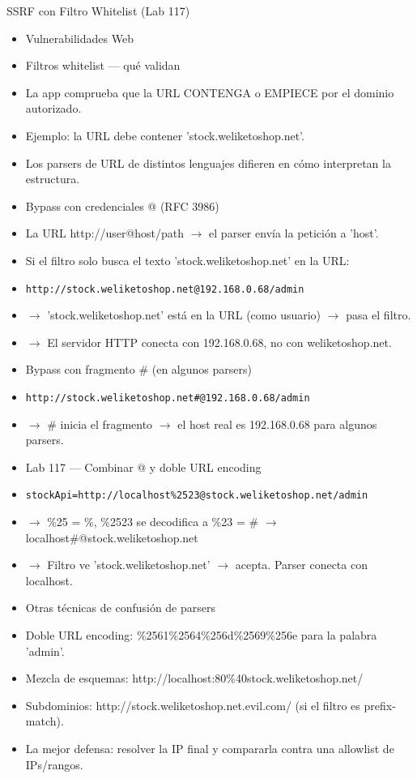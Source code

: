 \documentclass[aspectratio=169,10pt]{beamer}
\newcommand{\cmd}[1]{\texttt{\color{uznavy}#1}}
\begin{document}
\begin{frame}[allowframebreaks]{SSRF con Filtro Whitelist (Lab 117)}
\small
  \begin{itemize}
  \item Vulnerabilidades Web
  \item Filtros whitelist --- qué validan
  \item La app comprueba que la URL CONTENGA o EMPIECE por el dominio autorizado.
  \item Ejemplo: la URL debe contener 'stock.weliketoshop.net'.
  \item Los parsers de URL de distintos lenguajes difieren en cómo interpretan la estructura.
  \item Bypass con credenciales @ (RFC 3986)
  \item La URL http://user@host/path $\rightarrow$ el parser envía la petición a 'host'.
  \item Si el filtro solo busca el texto 'stock.weliketoshop.net' en la URL:
  \item \cmd{http://stock.weliketoshop.net@192.168.0.68/admin}
  \item $\rightarrow$ 'stock.weliketoshop.net' está en la URL (como usuario) $\rightarrow$ pasa el filtro.
  \item $\rightarrow$ El servidor HTTP conecta con 192.168.0.68, no con weliketoshop.net.
  \item Bypass con fragmento \# (en algunos parsers)
  \item \cmd{http://stock.weliketoshop.net\#@192.168.0.68/admin}
  \item $\rightarrow$ \# inicia el fragmento $\rightarrow$ el host real es 192.168.0.68 para algunos parsers.
  \item Lab 117 --- Combinar @ y doble URL encoding
  \item \cmd{stockApi=http://localhost\%2523@stock.weliketoshop.net/admin}
  \item $\rightarrow$ \%25 = \%, \%2523 se decodifica a \%23 = \# $\rightarrow$ localhost\#@stock.weliketoshop.net
  \item $\rightarrow$ Filtro ve 'stock.weliketoshop.net' $\rightarrow$ acepta. Parser conecta con localhost.
  \item Otras técnicas de confusión de parsers
  \item Doble URL encoding: \%2561\%2564\%256d\%2569\%256e para la palabra 'admin'.
  \item Mezcla de esquemas: http://localhost:80\%40stock.weliketoshop.net/
  \item Subdominios: http://stock.weliketoshop.net.evil.com/ (si el filtro es prefix-match).
  \item La mejor defensa: resolver la IP final y compararla contra una allowlist de IPs/rangos.
  \end{itemize}
\end{frame}
\end{document}
